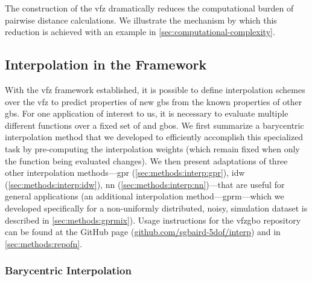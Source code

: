 \documentclass[final,twocolumn,12pt]{elsarticle}
\begin{document}
The construction of the \gls{vfz} dramatically reduces the computational burden of pairwise distance calculations. We illustrate the mechanism by which this reduction is achieved with an example in \cref{sec:computational-complexity}.
%
%
\subsection{Interpolation in the  Framework}
\label{sec:methods:interp}

With the \gls{vfz} framework established, it is possible to define interpolation schemes over the \gls{vfz} to predict properties of new \glspl{gb} from the known properties of other \glspl{gb}. For one application of interest to us, it is necessary to evaluate multiple different functions over a fixed set of \inpt{} and \outpt{} \glspl{gbo}. We first summarize a barycentric interpolation method %
that we developed\cite{bairdBarycentricInterpolation7SphereUnderReview} to efficiently accomplish this specialized task by pre-computing the interpolation weights (which remain fixed when only the function being evaluated changes). We then present adaptations of three other interpolation methods---\gls{gpr} (\cref{sec:methods:interp:gpr}), \gls{idw} (\cref{sec:methods:interp:idw}), \gls{nn} (\cref{sec:methods:interp:nn})---that are useful for general applications (an additional interpolation method---\gls{gprm}---which we developed specifically for a non-uniformly distributed, noisy, simulation dataset is described in \cref{sec:methods:gprmix}). %
Usage instructions for the \gls{vfzgbo} repository can be found at the GitHub page (\url{github.com/sgbaird-5dof/interp}) and in \cref{sec:methods:repofn}.
%
\subsubsection{Barycentric Interpolation}
\label{sec:methods:interp:bary}
\end{document}
